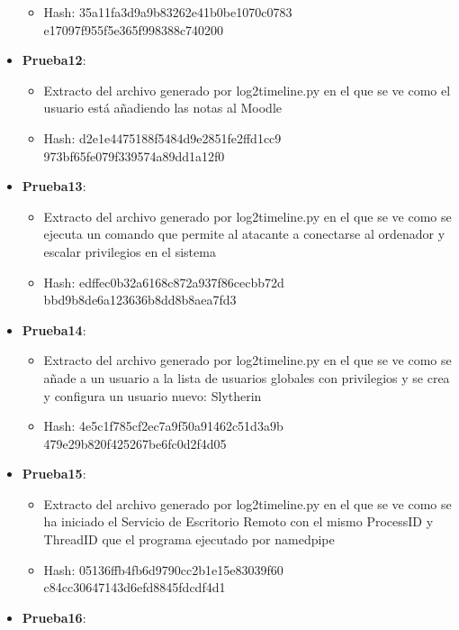 \begin{itemize}
{\begin{itemize}
      \item{Hash}: 35a11fa3d9a9b83262e41b0be1070c0783\\e17097f955f5e365f998388c740200
    \end{itemize}}
  \item{\textbf{Prueba12}: 
    \begin{itemize}
      \item{Extracto del archivo generado por log2timeline.py en el que se ve como el usuario está añadiendo las notas al Moodle}
      \item{Hash}: d2e1e4475188f5484d9e2851fe2ffd1cc9\\973bf65fe079f339574a89dd1a12f0
    \end{itemize}}
  \item{\textbf{Prueba13}: 
    \begin{itemize}
      \item{Extracto del archivo generado por log2timeline.py en el que se ve como se ejecuta un comando que permite al atacante a conectarse al ordenador y escalar privilegios en el sistema}
      \item{Hash}: edffec0b32a6168c872a937f86cecbb72d\\bbd9b8de6a123636b8dd8b8aea7fd3
    \end{itemize}}
  \item{\textbf{Prueba14}: 
    \begin{itemize}
      \item{Extracto del archivo generado por log2timeline.py en el que se ve como se añade a un usuario a la lista de usuarios globales con privilegios y se crea y configura un usuario nuevo: Slytherin}
      \item{Hash}: 4e5c1f785cf2ec7a9f50a91462c51d3a9b\\479e29b820f425267be6fc0d2f4d05
    \end{itemize}}
  \item{\textbf{Prueba15}: 
    \begin{itemize}
      \item{Extracto del archivo generado por log2timeline.py en el que se ve como se ha iniciado el Servicio de Escritorio Remoto con el mismo ProcessID y ThreadID que el programa ejecutado por namedpipe}
      \item{Hash}: 05136ffb4fb6d9790cc2b1e15e83039f60\\c84cc30647143d6efd8845fdcdf4d1
    \end{itemize}}
  \item{\textbf{Prueba16}: 
    \begin{itemize}

\end{itemize}}
\end{itemize}
